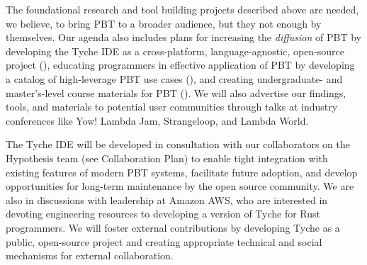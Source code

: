 {%



The foundational research and tool building projects described above
are needed, we believe, to bring PBT to a broader audience,
but they not enough by themselves. Our agenda also
includes plans for increasing the {\em diffusion} of PBT by developing the Tyche IDE as a
cross-platform, language-agnostic, open-source project (), educating
programmers in effective application of PBT by developing a catalog of
high-leverage PBT use cases (), and
creating undergraduate- and
master's-level course materials for PBT ().
We will also advertise our findings, tools, and materials to potential user communities
through talks at industry conferences like Yow! Lambda Jam, Strangeloop, and
Lambda World.

The Tyche IDE will be developed in consultation with
our collaborators on the Hypothesis team (see Collaboration Plan) to
enable tight integration with existing features of modern PBT systems,
facilitate future adoption, and develop opportunities for long-term maintenance
by the open source community.  We are also in discussions with
leadership at Amazon AWS, who are interested in devoting engineering
resources to developing a version of Tyche for Rust programmers.
We will foster external contributions by developing Tyche as a
public,
open-source project and creating appropriate technical and
social mechanisms for external collaboration.
%

}

